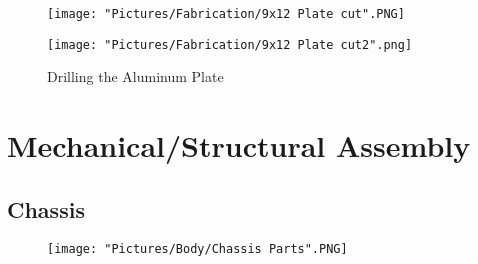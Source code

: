 \documentclass[12pt]{article}
\begin{document}
\begin{figure}[H]
  \centering
  \begin{minipage}[b]{0.45\textwidth}
    \texttt{[image: "Pictures/Fabrication/9x12 Plate cut".PNG]}
  \end{minipage}
  \hfill
  \begin{minipage}[b]{0.45\textwidth}
    \texttt{[image: "Pictures/Fabrication/9x12 Plate cut2".png]}
  \end{minipage}
  \caption{Drilling the Aluminum Plate}
  \label{Drilling the Al plate}
\end{figure}

\newpage

\section{Mechanical/Structural Assembly}
\subsection{Chassis}

\begin{figure}[H]
	\centering
	\texttt{[image: "Pictures/Body/Chassis Parts".PNG]}
\end{figure}
\end{document}
